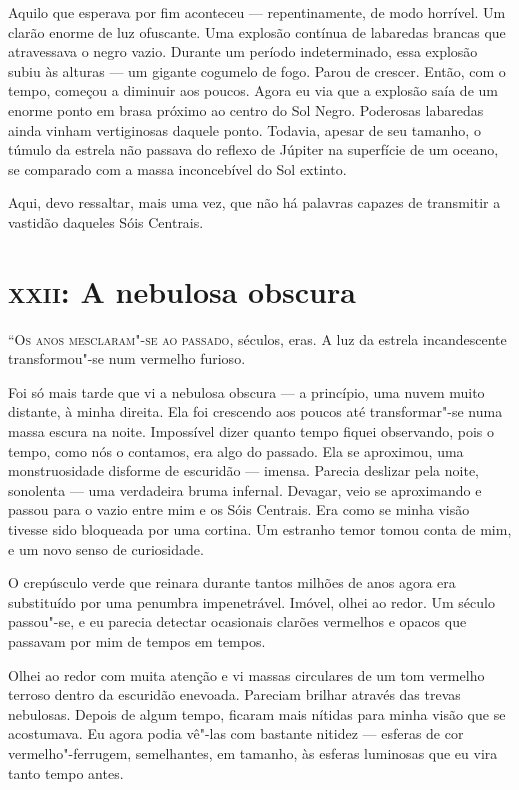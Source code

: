Aquilo que esperava por fim aconteceu --- repentinamente, de modo horrível. Um clarão enorme de luz ofuscante. Uma
explosão contínua de labaredas brancas que atravessava o negro vazio. Durante um período indeterminado, essa explosão
subiu às alturas --- um gigante cogumelo de fogo. Parou de crescer. Então, com o tempo, começou a diminuir aos poucos.
Agora eu via que a explosão saía de um enorme ponto em brasa próximo ao centro do Sol Negro. Poderosas labaredas
ainda vinham vertiginosas daquele ponto. Todavia, apesar de seu tamanho, o túmulo da estrela não passava do reflexo
de Júpiter na superfície de um oceano, se comparado com a massa inconcebível do Sol extinto.

Aqui, devo ressaltar, mais uma vez, que não há palavras capazes de transmitir a vastidão daqueles Sóis Centrais.


\clearpage

\chapter{\textsc{xxii}:  A nebulosa obscura}


\textsc{“Os anos mesclaram"-se ao passado,} séculos, eras. A luz da estrela incandescente transformou"-se num vermelho furioso.

Foi só mais tarde que vi a nebulosa obscura --- a princípio, uma nuvem muito distante, à minha direita. Ela foi crescendo
aos poucos até transformar"-se numa massa escura na noite. Impossível dizer quanto tempo fiquei observando, pois o
tempo, como nós o contamos, era algo do passado. Ela se aproximou, uma monstruosidade disforme de escuridão --- imensa.
Parecia deslizar pela noite, sonolenta --- uma verdadeira bruma infernal. Devagar, veio se aproximando e passou para o
vazio entre mim e os Sóis Centrais. Era como se minha visão tivesse sido bloqueada por uma cortina. Um estranho temor
tomou conta de mim, e um novo senso de curiosidade.

O crepúsculo verde que reinara durante tantos milhões de anos agora era substituído por uma penumbra impenetrável.
Imóvel, olhei ao redor. Um século passou"-se, e eu parecia detectar ocasionais clarões vermelhos e opacos que passavam
por mim de tempos em tempos.

Olhei ao redor com muita atenção e vi massas circulares de um tom vermelho terroso dentro da escuridão enevoada.
Pareciam brilhar através das trevas nebulosas. Depois de algum tempo, ficaram mais nítidas para minha visão que se
acostumava. Eu agora podia vê"-las com bastante nitidez --- esferas de cor vermelho"-ferrugem, semelhantes, em tamanho, às
esferas luminosas que eu vira tanto tempo antes.

